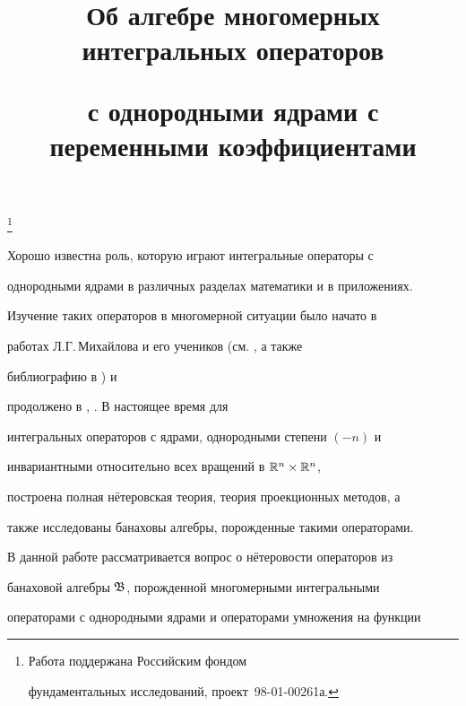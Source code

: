 \title{Об алгебре многомерных интегральных операторов


с однородными ядрами с переменными коэффициентами}


\thanks{Работа поддержана Российским фондом


фундаментальных исследований, проект \No\,98-01-00261а.}





\date{}




\pagestyle{plain} %







\maketitle


\label{begin}





Хорошо известна роль, которую играют интегральные операторы с


однородными ядрами в различных разделах математики и в приложениях.


Изучение таких операторов в многомерной ситуации было начато в


работах Л.Г.\,Михайлова и его учеников (см. \cite{b1}, а также


библиографию в \cite{b1}) и


продолжено в \cite{b2}, \cite{b3}. В настоящее время для


интегральных операторов с ядрами, однородными степени $(-n)$ и


инвариантными относительно всех вращений в $\Bbb R^n\times\Bbb R^n$,


построена полная н\"етеровская теория, теория проекционных методов, а


также исследованы банаховы алгебры, порожденные такими операторами.





В данной работе рассматривается вопрос о н\"етеровости операторов из


банаховой алгебры $\frak B$, порожденной многомерными интегральными


операторами с однородными ядрами и операторами умножения на функции


